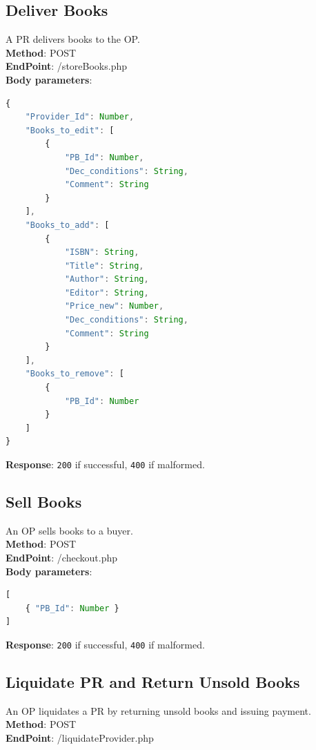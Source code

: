 \subsection{Deliver Books}
A PR delivers books to the OP.\\

\textbf{Method}: POST \\
\textbf{EndPoint}: /storeBooks.php \\

\textbf{Body parameters}:
\begin{lstlisting}[language=JavaScript, basicstyle=\ttfamily]
{
    "Provider_Id": Number,
    "Books_to_edit": [
        {
            "PB_Id": Number,
            "Dec_conditions": String,
            "Comment": String
        }
    ],
    "Books_to_add": [
        {
            "ISBN": String,
            "Title": String,
            "Author": String,
            "Editor": String,
            "Price_new": Number,
            "Dec_conditions": String,
            "Comment": String
        }
    ],
    "Books_to_remove": [
        {
            "PB_Id": Number
        }
    ]
}
\end{lstlisting}

\textbf{Response}: \texttt{200} if successful, \texttt{400} if malformed.

\subsection{Sell Books}
An OP sells books to a buyer.\\

\textbf{Method}: POST \\
\textbf{EndPoint}: /checkout.php \\

\textbf{Body parameters}:
\begin{lstlisting}[language=JavaScript, basicstyle=\ttfamily]
[
    { "PB_Id": Number }
]
\end{lstlisting}

\textbf{Response}: \texttt{200} if successful, \texttt{400} if malformed.

\subsection{Liquidate PR and Return Unsold Books}
An OP liquidates a PR by returning unsold books and issuing payment.\\

\textbf{Method}: POST \\
\textbf{EndPoint}: /liquidateProvider.php \\

